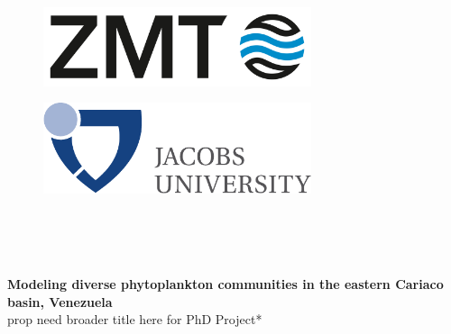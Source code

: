 \begin{titlepage}
\begin{center}

\begin{figure}[ht]
\begin{minipage}[b]{0.5\linewidth}
\centering
\includegraphics[width=0.7\textwidth]{./0-titel/ZMT_Logo_BILDMARKE_rgb_ENG.png}\\ 
\end{minipage}
\hspace{0.5cm}
\begin{minipage}[b]{0.5\linewidth}
\centering
\includegraphics[width=0.7\textwidth]{./0-titel/jacobs_big.pdf}\\
\end{minipage}
\end{figure}

\vspace{1cm}

\\[1.cm]

\\[1.5cm]

\vspace{2cm}

\\[0.5 cm]


{ \Huge \bfseries Modeling diverse phytoplankton communities in the eastern Cariaco basin, Venezuela}\\[0.4cm]

{\tiny*prop need broader title here for PhD Project*}


\end{center}
\end{titlepage}
